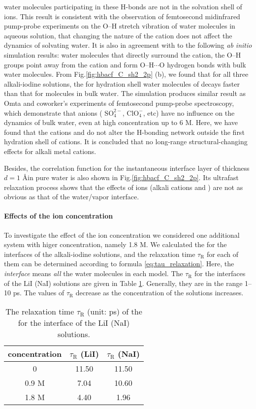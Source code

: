 water molecules participating in these H-bonds are not in the solvation shell of ions. 
This result is consistent with the observation of femtosecond midinfrared pump-probe experiments 
on the O--H stretch vibration of water molecules in aqueous solution,
that changing the nature of the cation does not affect the dynamics of solvating water\cite{Kropman2001}.
It is also in agreement with to the following \emph{ab initio} simulation results: water molecules that directly surround the cation, the O--H groups point
away from the cation and form O--H$\cdots$O hydrogen bonds with bulk water molecules\cite{Hashimoto1994,Ramaniah1998,Kropman2001}.
From Fig.\thinspace\ref{fig:hbacf_C_sh2_2p} (b), we found that for all three alkali-iodine solutions, the \CHB for hydration shell water molecules 
of \I decays faster than that for molecules in bulk water.
The simulation produces similar result as Omta and coworker's experiments of femtosecond pump-probe spectroscopy,
which demonstrate that anions ( $\text{SO}^{2-}_4$, $\text{ClO}^-_4$, etc) have no influence on the dynamics of bulk water, 
even at high concentration up to 6 M\cite{Omta2003, ZhangYanjie2006}. 
Here, we have found that the cations \Li and \Na do not alter the H-bonding network outside the first hydration shell of cations. 
It is concluded that no long-range structural-changing effects for alkali metal cations.

Besides, the correlation function \CHB for the instantaneous interface layer of thickness $d=1$ \AA in pure water is also shown in Fig.\thinspace\ref{fig:hbacf_C_sh2_2p}.
Its ultrafast relaxation process shows that the effects of ions (alkali cations and \I) are not as obvious as that of the water/vapor interface.

\FloatBarrier
\paragraph{Effects of the ion concentration}
To investigate the effect of the ion concentration we considered one additional system with higer concentration, namely 1.8 M.
We calculated the \CHB for the interfaces of the alkali-iodine solutions, 
and the relaxation time $\tau_{\text{R}}$ for each of them can be determined according to formula \ref{eq:tau_relaxation}. 
Here, the \emph{interface} means \emph{all} the water molecules in each model. 
The $\tau_{\text{R}}$ for the interfaces of the LiI (NaI) solutions are given in 
Table \ref{tab:tau_hb}. Generally, they are in the range 1--10 ps. 
The values of $\tau_{\text{R}}$ decrease as the concentration of the solutions increases.
\begin{table}[htbp]
\centering
\caption{\label{tab:tau_hb} 
  The relaxation time $\tau_{\text{R}}$ (unit: ps) of the \CHB  for the interface of the LiI (NaI) solutions.}
\begin{tabular}{ccc}
  concentration  & $\tau_{\text{R}}$ (LiI) & $\tau_{\text{R}}$ (NaI) \\
\hline
  0 & 11.50 & 11.50 \\
  0.9 M & 7.04 & 10.60 \\
  1.8 M & 4.40 & 1.96 
\end{tabular}
\end{table}

